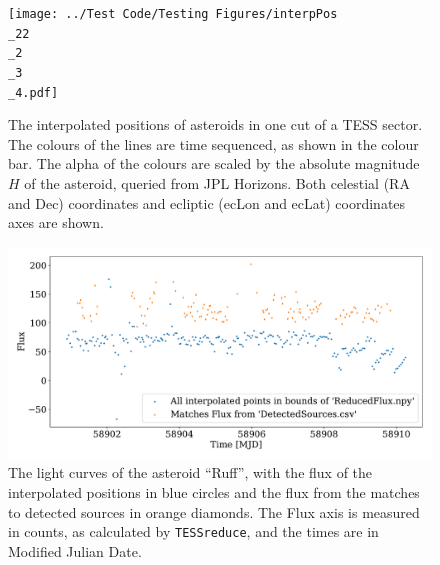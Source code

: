 \documentclass[12pt]{article}
\begin{document}

\begin{figure}
  \centering
    \texttt{[image: ../Test Code/Testing Figures/interpPos\\\_22\\\_2\\\_3\\\_4.pdf]}
    \caption{The interpolated positions of asteroids in one cut of a TESS sector. 
    The colours of the lines are time sequenced, as shown in the colour bar.
    The alpha of the colours are scaled by the absolute magnitude $H$ of the asteroid, queried from JPL Horizons. 
    Both celestial (RA and Dec) coordinates and ecliptic (ecLon and ecLat) coordinates axes are shown.
    }
    \label{Fig:interpPos}
\end{figure}



\begin{figure}
  \centering
  \includegraphics[width =\columnwidth]{../Test Code/Testing Figures/differentFluxes Ruff .pdf}
  \caption{The light curves of the asteroid ``Ruff'', with the flux of the interpolated positions in blue circles and the flux from the matches to detected sources in orange diamonds.
  The Flux axis is measured in counts, as calculated by \texttt{TESSreduce}, and the times are in Modified Julian Date.}
  \label{Fig:DifFlux}
\end{figure}
    





\def\bibfont{\tiny}


\end{document}
